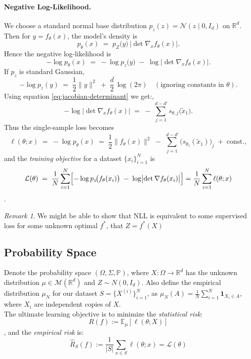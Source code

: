 \documentclass[11pt, a4paper]{article}
\theoremstyle{definition}
\theoremstyle{remark}
\newtheorem{remark}[theorem]{Remark}
\newcommand{\R}{\mathbb{R}}
\newcommand{\E}{\mathbb{E}}
\newcommand{\Prob}{\mathbb{P}}
\begin{document}
	\paragraph{Negative Log-Likelihood.}
	We choose a standard normal base distribution $p_z(z) = \mathcal{N}(z \mid 0, I_d)$ on $\mathbb{R}^d$. 
	Then for $y = f_\theta(x)$, 
	the model's density is 
	\[
	p_\theta(x)
	\;=\;
	p_Z\bigl(y\bigr)
	\,\bigl|\det \nabla_x f_\theta(x)\bigr|.
	\]
	Hence the negative log-likelihood is
	\[
	-\log p_\theta(x)
	\;=\;
	-\log p_z\!\bigl(y\bigr)
	\;-\; 
	\log \bigl|\det \nabla_x f_\theta(x)\bigr|.
	\]
	If $p_z$ is standard Gaussian, 
	\[
	-\log p_z(y)
	\;=\;
	\frac12 \|y\|^2 \;+\; \frac{d}{2}\,\log (2\pi)
	\quad (\text{ignoring constants in } \theta).
	\]
	Using equation \ref{eq:jacobian-determinant} we get:,
	\[
	-\log \bigl|\det \nabla_x f_\theta(x)\bigr|
	\;=\;
	-\,\sum_{j=1}^{\,d-d'} s_{\theta,j}\!\bigl(\tilde{x}_1\bigr).
	\]
	Thus the single-sample loss becomes
	\[
	\ell(\theta; x)
	\;=\;
	-\log p_\theta(x)
	\;=\;
	\frac12 \|f_\theta(x)\|^2 
	\;-\;
	\sum_{j=1}^{\,d-d'} \bigl(s_{\theta_1}(\tilde{x}_1)\bigr)_j
	\;+\;
	\text{const.},
	\]
	and the \emph{training objective} for a dataset $\{x_i\}_{i=1}^N$ is 
	\[
	\mathcal{L}(\theta)
	\;=\;
	\frac{1}{N} \sum_{i=1}^N
	\Bigl[
	- \log p_z\!\bigl(f_\theta(x_i)\bigr)
	\;-\;
	\log \bigl|\det \nabla f_\theta(x_i)\bigr|
	\Bigr] 	= \frac1N \sum_{i=1}^{N} \ell(\theta;x)
	\].

	\begin{remark}
		We might be able to show that NLL is equivalent to some supervised loss for some unknown optimal \(f^*\), that \(Z = f^*(X)\)
	\end{remark}

	\subsection{Probability Space}
	
	Denote the probability space \((\Omega,\Sigma,\Prob)\), where \(X: \Omega \to \R^d\) has the unknown distribution \(\mu \in \mathcal{M}(\R^d)\) and \(Z \sim N(0,I_d)\). Also define the empirical distribution \(\mu_N\) for our dataset \(S=\{X^{(i)}\}_{i=1}^N\), as \(\mu_N(A) = \frac{1}{N}\sum_{i=1}^{N} \mathbf{1}_{X_i \in A}\), where \(X_i\) are independent copies of \(X\).\\
	
	The ultimate learning objective is to minimize the \textit{statistical risk}:
	\[
	R(f):=\E_\mu[\ell(\theta;X)]
	\]
	, and the \textit{empirical risk} is: 
	\[
	\hat{R}_S(f):=\frac{1}{|S|}\sum_{x\in S} \ell(\theta;x) = \mathcal{L}(\theta)
	\]
	
\end{document}
